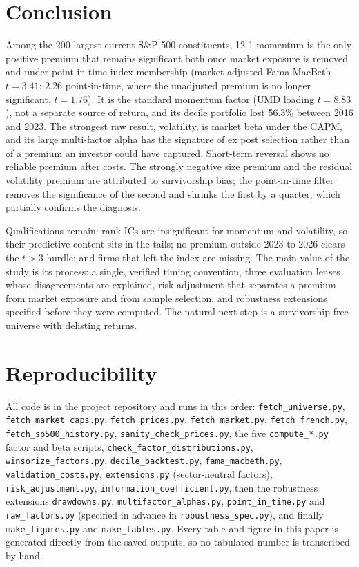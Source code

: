 \documentclass[11pt,a4paper]{article}
\begin{document}
\section{Conclusion}

Among the 200 largest current S\&P 500 constituents, 12-1 momentum is the only positive premium that remains significant both once market exposure is removed and under point-in-time index membership (market-adjusted Fama-MacBeth $t = 3.41$; $2.26$ point-in-time, where the unadjusted premium is no longer significant, $t = 1.76$). It is the standard momentum factor (UMD loading $t = 8.83$), not a separate source of return, and its decile portfolio lost 56.3\% between 2016 and 2023. The strongest raw result, volatility, is market beta under the CAPM, and its large multi-factor alpha has the signature of ex post selection rather than of a premium an investor could have captured. Short-term reversal shows no reliable premium after costs. The strongly negative size premium and the residual volatility premium are attributed to survivorship bias; the point-in-time filter removes the significance of the second and shrinks the first by a quarter, which partially confirms the diagnosis.

Qualifications remain: rank ICs are insignificant for momentum and volatility, so their predictive content sits in the tails; no premium outside 2023 to 2026 clears the $t > 3$ hurdle; and firms that left the index are missing. The main value of the study is its process: a single, verified timing convention, three evaluation lenses whose disagreements are explained, risk adjustment that separates a premium from market exposure and from sample selection, and robustness extensions specified before they were computed. The natural next step is a survivorship-free universe with delisting returns.

\section*{Reproducibility}

{\raggedright
All code is in the project repository and runs in this order: \texttt{fetch\_universe.py}, \texttt{fetch\_market\_caps.py}, \texttt{fetch\_prices.py}, \texttt{fetch\_market.py}, \texttt{fetch\_french.py}, \texttt{fetch\_sp500\_history.py}, \texttt{sanity\_check\_prices.py}, the five \texttt{compute\_*.py} factor and beta scripts, \texttt{check\_factor\_distributions.py}, \texttt{winsorize\_factors.py}, \texttt{decile\_backtest.py}, \texttt{fama\_macbeth.py}, \texttt{validation\_costs.py}, \texttt{extensions.py} (sector-neutral factors), \texttt{risk\_adjustment.py}, \texttt{information\_coefficient.py}, then the robustness extensions \texttt{drawdowns.py}, \texttt{multifactor\_alphas.py}, \texttt{point\_in\_time.py} and \texttt{raw\_factors.py} (specified in advance in \texttt{robustness\_spec.py}), and finally \texttt{make\_figures.py} and \texttt{make\_tables.py}. Every table and figure in this paper is generated directly from the saved outputs, so no tabulated number is transcribed by hand.\par}
\end{document}
